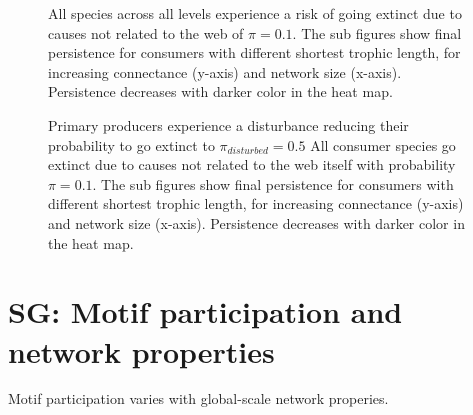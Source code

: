 \documentclass[12pt]{article}
\begin{document}
\begin{spacing}{2.0}
    \begin{figure}[h!]
     \centering
     \caption{All species across all levels experience a risk of going extinct due to causes not related to the web of $\pi = 0.1$. The sub figures show final persistence for consumers with different shortest trophic length, for increasing connectance (y-axis) and network size (x-axis). Persistence decreases with darker color in the heat map.}
     \label{fig:heatmap_stl_BP0}
    \end{figure}


    \begin{figure}[h!]
     \centering
     \caption{Primary producers experience a disturbance reducing their probability to go extinct to $\pi_{disturbed} = 0.5$ All consumer species go extinct due to causes not related to the web itself with probability $\pi = 0.1$. The sub figures show final persistence for consumers with different shortest trophic length, for increasing connectance (y-axis) and network size (x-axis). Persistence decreases with darker color in the heat map.}
     \label{fig:heatmap_stl_BP1}
    \end{figure}

\clearpage

\section{SG: Motif participation and network properties}


    Motif participation varies with global-scale network properies.


\end{spacing}
\end{document}
